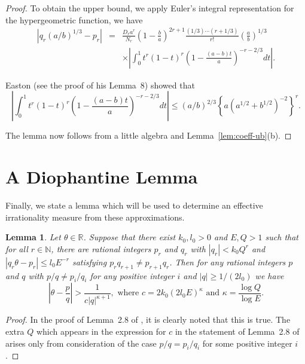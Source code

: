\documentclass{jT}
\newtheorem{lemma}[theorem]{Lemma}
\theoremstyle{definition}
\begin{document}
\begin{proof}
To obtain the upper bound, we apply Euler's integral 
representation for the hypergeometric function, we have 
\begin{eqnarray*}
\left| q_{r} (a/b)^{1/3} - p_{r} \right| 
& = & \frac{D_{r}a^{r}}{N_{r}} { \left( 1 - \frac{b}{a} \right) }^{2r+1} 
      \frac{(1/3) \cdots (r+1/3)}{r!} { \left( \frac{a}{b} \right) }^{1/3} \\
&   & \times \left| \int_{0}^{1} t^{r}(1-t)^{r} 
				 { \left( 1 - \frac{(a-b)t}{a} \right) 
				 }^{-r-2/3} dt \right|. 
\end{eqnarray*}

Easton (see the proof of his Lemma~8) showed that 
\begin{displaymath}
\left| \int_{0}^{1} t^{r}(1-t)^{r} { \left( 1 - \frac{(a-b)t}{a} \right) 
				   }^{-r-2/3} dt \right|  
\leq (a/b)^{2/3} { \left\{ a { \left( a^{1/2}+b^{1/2} \right) }^{-2} \right\} 
		 }^{r}.  
\end{displaymath}

The lemma now follows from a little algebra and Lemma~\ref{lem:coeff-ub}(b). 
\end{proof}

\section{A Diophantine Lemma}

Finally, we state a lemma which will be used to determine 
an effective irrationality measure from these approximations. 

\begin{lemma}
\label{lem:kappa}
Let $\theta \in \mathbb{R}$. Suppose that there exist $k_{0},l_{0} > 0$ 
and $E,Q > 1$ such that for all $r \in \mathbb{N}$, there are rational 
integers $p_{r}$ and $q_{r}$ with $|q_{r}| < k_{0}Q^{r}$ and 
$|q_{r} \theta - p_{r}| \leq l_{0}E^{-r}$ satisfying 
$p_{r}q_{r+1} \neq p_{r+1}q_{r}$. Then for any rational 
integers $p$ and $q$ with $p/q \neq p_{i}/q_{i}$ for any 
positive integer $i$ and $|q| \geq 1/(2l_{0})$ we have 
\begin{displaymath}
\left| \theta - \frac{p}{q} \right| > \frac{1}{c |q|^{\kappa+1}}, 
\mbox{ where $c=2k_{0}(2l_{0}E)^{\kappa}$ and 
	     $\kappa = \displaystyle \frac{\log Q}{\log E}$.} 
\end{displaymath}             
\end{lemma}

\begin{proof}
In the proof of Lemma~2.8 of \cite{CV}, it is clearly 
noted that this is true. The extra $Q$ which appears 
in the expression for $c$ in the statement of Lemma~2.8 
of \cite{CV} arises only from consideration of the case 
$p/q=p_{i}/q_{i}$ for some positive integer $i$. 
\end{proof}
\end{document}
